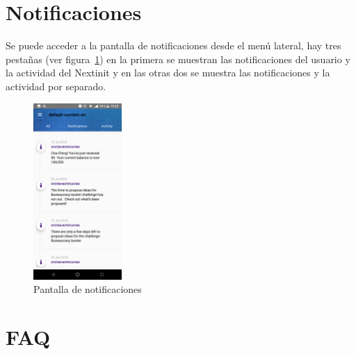 \section{Notificaciones}

Se puede acceder a la pantalla de notificaciones desde el menú lateral, hay tres pestañas 
(ver figura~\ref{fig:notificaciones}) en la primera se muestran las notificaciones del usuario 
y la actividad del Nextinit y en las otras dos se muestra las notificaciones y la actividad 
por separado.

\begin{figure}[!h]
	\begin{center}
		\includegraphics[width=0.3\textwidth]{./img/anexo1/notificaciones_all.png}
		\caption{Pantalla de notificaciones}
		\label{fig:notificaciones}
	\end{center}
\end{figure}

\section{FAQ}
